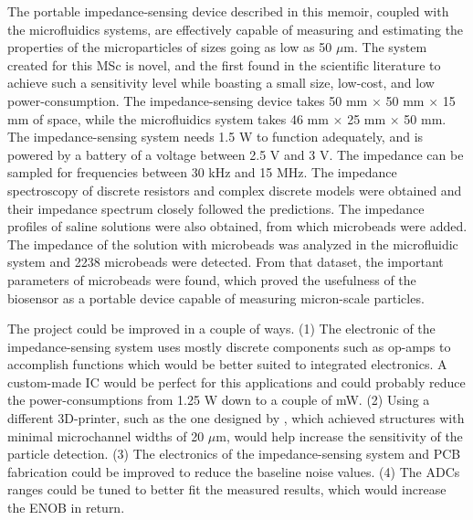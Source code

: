 The portable impedance-sensing device described in this memoir, coupled with the microfluidics systems, are effectively capable of measuring and estimating the properties of the microparticles of sizes going as low as 50 $\mu$m. The system created for this MSc is novel, and the first found in the scientific literature to achieve such a sensitivity level while boasting a small size, low-cost, and low power-consumption. The impedance-sensing device takes 50 mm $\times$ 50 mm $\times$ 15 mm of space, while the microfluidics system takes 46 mm $\times$ 25 mm $\times$ 50 mm. The impedance-sensing system needs 1.5 W to function adequately, and is powered by a battery of a voltage between 2.5 V and 3 V. The impedance can be sampled for frequencies between 30 kHz and 15 MHz. The impedance spectroscopy of discrete resistors and complex discrete models were obtained and their impedance spectrum closely followed the predictions. The impedance profiles of saline solutions were also obtained, from which microbeads were added. The impedance of the solution with microbeads was analyzed in the microfluidic system and 2238 microbeads were detected. From that dataset, the important parameters of microbeads were found, which proved the usefulness of the biosensor as a portable device capable of measuring micron-scale particles. \par

The project could be improved in a couple of ways. (1) The electronic of the impedance-sensing system uses mostly discrete components such as op-amps to accomplish functions which would be better suited to integrated electronics. A custom-made IC would be perfect for this applications and could probably reduce the power-consumptions from 1.25 W down to a couple of mW. (2) Using a different 3D-printer, such as the one designed by \citep{Gong2017}, which achieved structures with minimal microchannel widths of 20 $\mu$m, would help increase the sensitivity of the particle detection. (3) The electronics of the impedance-sensing system and PCB fabrication could be improved to reduce the baseline noise values. (4) The ADCs ranges could be tuned to better fit the measured results, which would increase the ENOB in return.